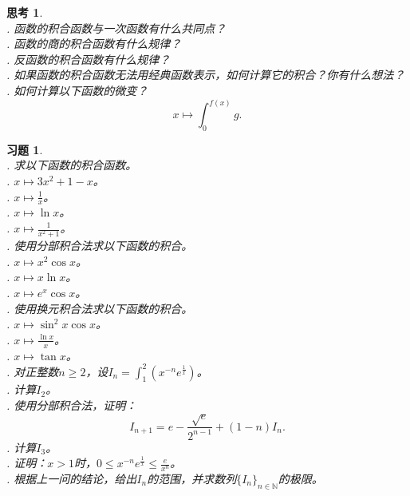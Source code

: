 \documentclass[12pt,UTF8]{ctexbook}
\newtheorem{sk}{思考}[section]
\newtheorem{xt}{习题}[section]
\begin{document}
\begin{sk}
    \mbox{} \\
    . 函数的积合函数与一次函数有什么共同点？ \\
    . 函数的商的积合函数有什么规律？\\
    . 反函数的积合函数有什么规律？\\
    . 如果函数的积合函数无法用经典函数表示，如何计算它的积合？你有什么想法？\\
    . 如何计算以下函数的微变？
    $$x\mapsto \int_0^{f(x)} g.$$
\end{sk}

\begin{xt}
    \mbox{} \\
    . 求以下函数的积合函数。\\
    . $x\mapsto 3x^2 + 1 - x$。\\
    . $x\mapsto \frac{1}{x}$。\\
    . $x\mapsto \ln{x}$。\\
    . $x\mapsto \frac{1}{x^2 + 1}$。\\
    . 使用分部积合法求以下函数的积合。\\
    . $x\mapsto x^2 \cos{x}$。 \\
    . $x\mapsto x \ln{x} $。 \\
    . $x\mapsto e^x \cos{x} $。 \\
    . 使用换元积合法求以下函数的积合。\\
    . $x\mapsto \sin^2{x} \cos{x}$。 \\
    . $x\mapsto \frac{\ln{x}}{x} $。 \\
    . $x\mapsto \tan{x} $。 \\
    . 对正整数$n\geqslant 2$，设$I_n = \int_1^2 \left(x^{-n}e^{\frac{1}{x}}\right)$。\\
    . 计算$I_2$。\\
    . 使用分部积合法，证明：
            $$ I_{n+1} = e - \frac{\sqrt{e}}{2^{n-1}} + (1 - n)I_n.$$
    . 计算$I_3$。\\
    . 证明：$x>1$时，$0\leqslant x^{-n}e^{\frac{1}{x}} \leqslant \frac{e}{x^n}$。\\
    . 根据上一问的结论，给出$I_n$的范围，并求数列$\{I_n\}_{n\in\mathbb{N}}$的极限。
\end{xt}
\end{document}

